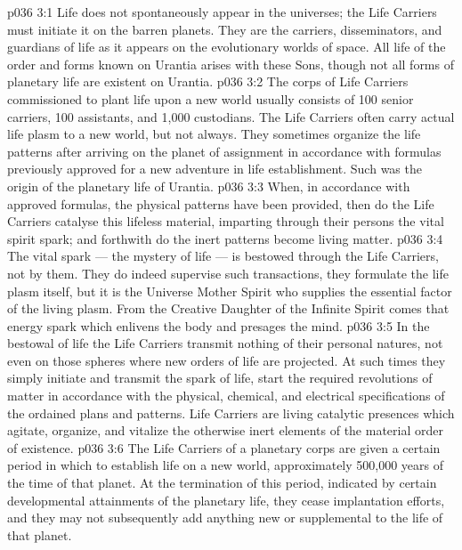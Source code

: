 \vs p036 3:1 Life does not spontaneously appear in the universes; the Life Carriers must initiate it on the barren planets. They are the carriers, disseminators, and guardians of life as it appears on the evolutionary worlds of space. All life of the order and forms known on Urantia arises with these Sons, though not all forms of planetary life are existent on Urantia.
\vs p036 3:2 The corps of Life Carriers commissioned to plant life upon a new world usually consists of 100 senior carriers, 100 assistants, and 1,000 custodians. The Life Carriers often carry actual life plasm to a new world, but not always. They sometimes organize the life patterns after arriving on the planet of assignment in accordance with formulas previously approved for a new adventure in life establishment. Such was the origin of the planetary life of Urantia.
\vs p036 3:3 When, in accordance with approved formulas, the physical patterns have been provided, then do the Life Carriers catalyse this lifeless material, imparting through their persons the vital spirit spark; and forthwith do the inert patterns become living matter.
\vs p036 3:4 \pc The vital spark --- the mystery of life --- is bestowed through the Life Carriers, not by them. They do indeed supervise such transactions, they formulate the life plasm itself, but it is the Universe Mother Spirit who supplies the essential factor of the living plasm. From the Creative Daughter of the Infinite Spirit comes that energy spark which enlivens the body and presages the mind.
\vs p036 3:5 \pc In the bestowal of life the Life Carriers transmit nothing of their personal natures, not even on those spheres where new orders of life are projected. At such times they simply initiate and transmit the spark of life, start the required revolutions of matter in accordance with the physical, chemical, and electrical specifications of the ordained plans and patterns. Life Carriers are living catalytic presences which agitate, organize, and vitalize the otherwise inert elements of the material order of existence.
\vs p036 3:6 \pc The Life Carriers of a planetary corps are given a certain period in which to establish life on a new world, approximately 500,000 years of the time of that planet. At the termination of this period, indicated by certain developmental attainments of the planetary life, they cease implantation efforts, and they may not subsequently add anything new or supplemental to the life of that planet.

